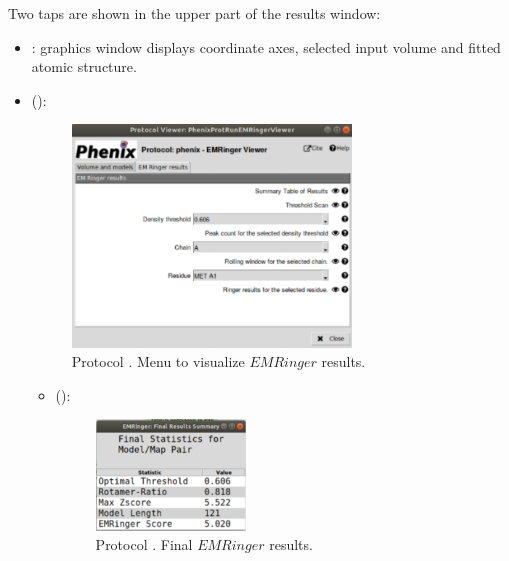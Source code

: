 \begin{itemize}
   Two taps are shown in the upper part of the results window:
    \begin{itemize}
     \item {}:
     \chimera graphics window displays coordinate axes, selected input volume and fitted atomic structure.
     \item {} ():
     
     \begin{figure}[H]
     \centering 
     \captionsetup{width=.7\linewidth} 
     \includegraphics[width=0.70\textwidth]{Images_appendix/Fig141.pdf}
     \caption{Protocol . Menu to visualize $EMRinger$ results.}
     \label{fig:app_protocol_emringer_3}
    \end{figure}
      \begin{itemize}
        \item {} ():
        \begin{figure}[H]
         \centering 
         \captionsetup{width=.7\linewidth} 
         \includegraphics[width=0.40\textwidth]{Images_appendix/Fig142.pdf}
         \caption{Protocol . Final $EMRinger$ results.}
        \label{fig:app_protocol_emringer_4}
     \end{figure}
         \begin{itemize}

\end{itemize}
\end{itemize}
\end{itemize}
\end{itemize}
